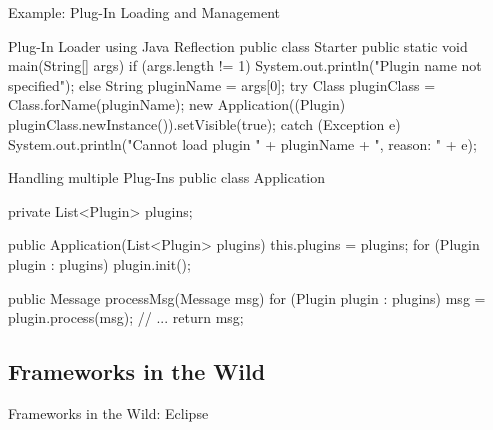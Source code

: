\begin{frame}[fragile]{Example: Plug-In Loading and Management}
	\small\begin{mycolumns}[columns=2,widths={50,50}]
\begin{codetight}{Plug-In Loader using Java Reflection}
public class Starter {
	public static void main(String[] args) {
		if (args.length != 1)
			System.out.println("Plugin name not specified");
		else {
			String pluginName = args[0];
			try {
				Class pluginClass = Class.forName(pluginName);
				new Application((Plugin) 
					pluginClass.newInstance()).setVisible(true);
			} catch (Exception e) {
				System.out.println("Cannot load plugin " + 
					pluginName + ", reason: " + e);
			}
		}
	}
}
\end{codetight}
		\mynextcolumn
\begin{codetight}{Handling multiple Plug-Ins}
public class Application {
	private List<Plugin> plugins;

	public Application(List<Plugin> plugins) {
		this.plugins = plugins;
		for (Plugin plugin : plugins) {
			plugin.init();
		}
	}

	public Message processMsg(Message msg) {
		for (Plugin plugin : plugins) {
			msg = plugin.process(msg);
			// ...
		}
		return msg;
	}
}
\end{codetight}
	\end{mycolumns}
\end{frame}

\subsection{Frameworks in the Wild}
\begin{frame}{Frameworks in the Wild: Eclipse}
	\begin{mycolumns}[widths={70,30},animation=none]
	\mynextcolumn
		\vspace{-0.7cm}
	\end{mycolumns}
\end{frame}

